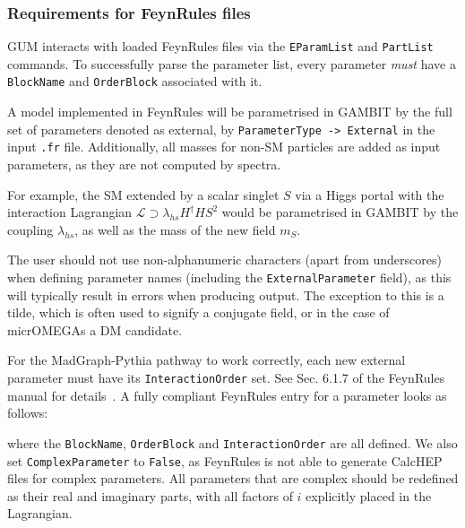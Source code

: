 \documentclass[pdftex,twocolumn,epjc3_preprint,runningheads]{svjour3}
\renewcommand{\_}{\discretionary{\underscore}{}{\underscore}}
\newcommand\term[1]{{\lstset{style=terminal}\lstinline!#1!\lstset{style=cpp}}}
\newcommand\mathematica[1]{{\lstset{style=Mathematica}\lstinline!#1!\lstset{style=cpp}}}
\newcommand{\gambit}{\textsf{GAMBIT}\xspace}
\newcommand{\GB}{\gambit}
\newcommand{\pythia}{\textsf{Pythia}\xspace}
\newcommand{\mo}{\micromegas}
\newcommand{\micromegas}{\textsf{micrOMEGAs}\xspace}
\newcommand{\gum}{\textsf{GUM}\xspace}
\newcommand{\fr}{\textsf{FeynRules}\xspace}
\newcommand{\CH}{\textsf{CalcHEP}\xspace}
\newcommand{\MG}{\textsf{MadGraph}\xspace}
\begin{document}
\subsubsection{Requirements for \fr files} \label{sec:fr_params}

\gum interacts with loaded \fr files via the \mathematica{EParamList} and \mathematica{PartList} commands. To successfully parse the parameter list, every parameter \textit{must} have a \mathematica{BlockName} and \mathematica{OrderBlock} associated with it.

A model implemented in \fr will be parametrised in \GB by the full set of parameters denoted as external, by \mathematica{ParameterType -> External} in the input \term{.fr} file. Additionally, all masses for non-SM particles are added as input parameters, as they are not computed by spectra.

For example, the SM extended by a scalar singlet $S$ via a Higgs portal with the interaction Lagrangian $\mathcal{L} \supset \lambda_{hs} H^\dagger H S^2$ would be parametrised in \GB by the coupling $\lambda_{hs}$, as well as the mass of the new field $m_S$.

The user should not use non-alphanumeric characters (apart from underscores) when defining parameter names (including the \mathematica{ExternalParameter} field), as this will typically result in errors when producing output. The exception to this is a tilde, which is often used to signify a conjugate field, or in the case of \mo a DM candidate.

For the \MG-\pythia pathway to work correctly, each new external parameter must have its \mathematica{InteractionOrder} set. See Sec. 6.1.7 of the \fr manual for details~\cite{Alloul:2013bka}. A fully compliant \fr entry for a parameter looks as follows:
%
\begin{lstmathematica}
M$Parameters = {
  ...
  gchi == {
    ParameterType    -> External,
    ComplexParameter -> False,
    InteractionOrder -> {NP, 1},
    BlockName        -> DMINT,
    OrderBlock       -> 1,
    Value            -> 1.,
    TeX              -> Subscript[g,\\[Chi]],
    Description      -> "DM-mediator coupling"
  },
  ...
\end{lstmathematica}
%
where the \mathematica{BlockName}, \mathematica{OrderBlock} and \mathematica{InteractionOrder} are all defined. We also set \mathematica{ComplexParameter} to \mathematica{False}, as \fr is not able to generate \CH files for complex parameters. All parameters that are complex should be redefined as their real and imaginary parts, with all factors of $i$ explicitly placed in the Lagrangian.
\end{document}
